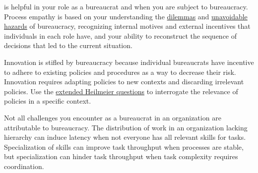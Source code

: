 \iftoggle{glossarysubstitutionworks}{\Gls{process empathy}}{Process empathy} 
is helpful in your role as a bureaucrat and when you are subject to bureaucracy. 
Process empathy is based on your understanding the \hyperref[sec:dilemma-trilemma]{dilemmas} and \hyperref[sec:unavoidable-hazards]{unavoidable hazards} of bureaucracy, recognizing internal \gls{motives} and external \gls{incentives} that individuals in each role have, and your ability to reconstruct the sequence of decisions that led to the current situation. 


Innovation is stifled by bureaucracy%
\iftoggle{haspagenumbers}{(see page~\pageref{sec:innovation})}{} because individual bureaucrats have incentive to adhere to existing policies and procedures as a way to decrease their risk. Innovation requires adapting policies to new contexts and discarding irrelevant policies. 
Use the \hyperref[sec:extending-Heilmeier]{extended Heilmeier questions}%
\iftoggle{haspagenumbers}{(see page~\pageref{sec:extending-Heilmeier})}{} to interrogate the relevance of policies in a specific context.


Not all challenges you encounter as a bureaucrat in an organization are attributable to bureaucracy. The distribution of work in an organization lacking hierarchy can induce latency when not everyone has all relevant skills for tasks. Specialization of skills can improve task throughput when processes are stable, but specialization can hinder task throughput when task complexity requires coordination.

